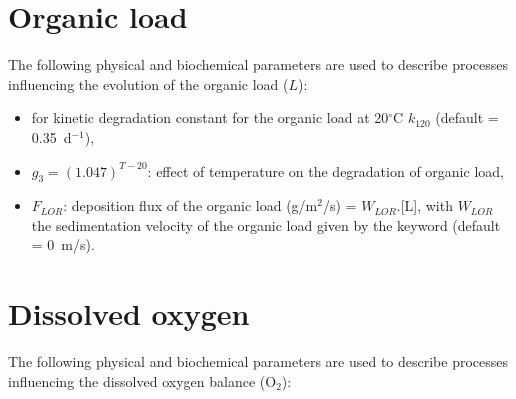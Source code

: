 \section{Organic load}

The following physical and biochemical parameters are used to describe processes
influencing the evolution of the organic load ($L$):

\begin{itemize}
\item {}
  for kinetic degradation constant for the organic load at 20$^{\circ}$C $k_{120}$
  (default = 0.35~d$^{-1}$),
\item $g_3 = (1.047)^{T-20}$: effect of temperature on the degradation of organic load,
\item $F_{LOR}$: deposition flux of the organic load (g/m$^2$/s) = $W_{LOR}$.[L],
  with $W_{LOR}$ the sedimentation velocity of the organic load
  given by the keyword 
  (default = 0~m/s).
\end{itemize}

\section{Dissolved oxygen}

The following physical and biochemical parameters are used to describe processes
influencing the dissolved oxygen balance (O$_2$):

